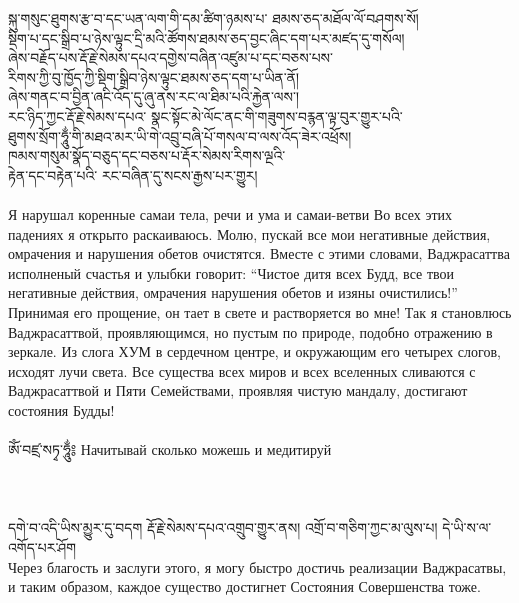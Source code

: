 \newpage
\ti
སྐུ་གསུང་ཐུགས་རྩ་བ་དང་ཡན་ལག་གི་དམ་ཚིག་ཉམས་པ་ ཐམས་ཅད་མཐོལ་ལོ་བཤགས་སོ། \\
སྡིག་པ་དང་སྒྲིབ་པ་ཉེས་ལྟུང་དྲི་མའི་ཚོགས་ཐམས་ཅད་བྱང་ཞིང་དག་པར་མཛད་དུ་གསོལ། \\
ཞེས་བརྗོད་པས་རྡོ་རྗེ་སེམས་དཔའ་དགྱེས་བཞིན་འཛུམ་པ་དང་བཅས་པས་ \\
རིགས་ཀྱི་བུ་ཁྱོད་ཀྱི་སྡིག་སྒྲིབ་ཉེས་ལྟུང་ཐམས་ཅད་དག་པ་ཡིན་ནོ། \\
ཞེས་གནང་བ་བྱིན་ཞངི་འོད་དུ་ཞུ་ནས་རང་ལ་ཐིམ་པའི་རྐྱེན་ལས་། \\
རང་ཉིད་ཀྱང་རྡོ་རྗེ་སེམས་དཔའ་ སྣང་སྟོང་མེ་ལོང་ནང་གི་གཟུགས་བརྙན་ལྟ་བུར་གྱུར་པའི་ \\
ཐུགས་སྲོག་ཧཱུྂ་གི་མཐའ་མར་ཡི་གེ་འབྲུ་བཞི་པོ་གསལ་བ་ལས་འོད་ཟེར་འཕྲོས། \\
ཁམས་གསུམ་སྣོད་བཅུད་དང་བཅས་པ་རྡོར་སེམས་རིགས་ལྔའི་\\
རྟེན་དང་བརྟེན་པའི་ རང་བཞིན་དུ་སངས་རྒྱས་པར་གྱུར།\\
\\
\ru
Я нарушал коренные самаи тела, речи и ума и самаи-ветви
Во всех этих падениях я открыто раскаиваюсь.
Молю, пускай все мои негативные действия, омрачения и нарушения обетов очистятся.
Вместе с этими словами, Ваджрасаттва исполненый счастья и улыбки говорит:
“Чистое дитя всех Будд, все твои негативные действия, омрачения
нарушения обетов и изяны очистились!”
Принимая его прощение, он тает в свете и раство\-ряется во мне!
Так я становлюсь Ваджрасаттвой,
проявляющи\-мся, но пустым по природе, подобно отражению в зеркале.
Из слога ХУМ в сердечном центре, и окружающим его четырех слогов, исходят лучи света.
Все существа всех миров и всех вселенных
сливаются с Ваджрасаттвой и Пяти Семействами, проявляя чистую мандалу,
достигают состояния Будды!\\
\\
\scriptsize
\ti
ཨོཾ་བཛྲ་སཏྭ་ཧཱུྂ༔ \ru Начитывай сколько можешь и медитируй\\
\\
\\
\\
\ti
དགེ་བ་འདི་ཡིས་མྱུར་དུ་བདག རྡོ་རྗེ་སེམས་དཔའ་འགྲུབ་གྱུར་ནས། འགྲོ་བ་གཅིག་ཀྱང་མ་ལུས་པ། དེ་ཡི་ས་ལ་འགོད་པར་ཤོག\\
\ru
Через благость и заслуги этого, я могу быстро достичь реализации Ваджрасатвы,
и таким образом, каждое существо достигнет Состояния Совершенства тоже.
\normalsize
